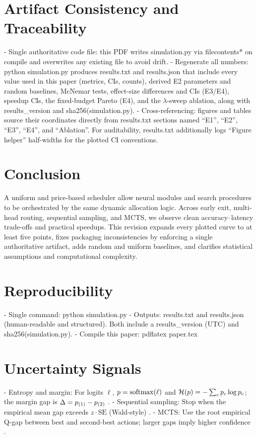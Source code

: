 \section{Artifact Consistency and Traceability}
- Single authoritative code file: this PDF writes simulation.py via filecontents* on compile and overwrites any existing file to avoid drift.
- Regenerate all numbers: python simulation.py produces results.txt and results.json that include every value used in this paper (metrics, CIs, counts), derived E2 parameters and random baselines, McNemar tests, effect-size differences and CIs (E3/E4), speedup CIs, the fixed-budget Pareto (E4), and the $\lambda$-sweep ablation, along with results\_version and sha256(simulation.py).
- Cross-referencing: figures and tables source their coordinates directly from results.txt sections named ``E1'', ``E2'', ``E3'', ``E4'', and ``Ablation''. For auditability, results.txt additionally logs ``Figure helper'' half-widths for the plotted CI conventions.

\section{Conclusion}
A uniform \TickAPI{} and price-based scheduler allow neural modules and search procedures to be orchestrated by the same dynamic allocation logic. Across early exit, multi-head routing, sequential sampling, and MCTS, we observe clean accuracy--latency trade-offs and practical speedups. This revision expands every plotted curve to at least five points, fixes packaging inconsistencies by enforcing a single authoritative artifact, adds random and uniform baselines, and clarifies statistical assumptions and computational complexity.

\section*{Reproducibility}
- Single command: python simulation.py
- Outputs: results.txt and results.json (human-readable and structured). Both include a results\_version (UTC) and sha256(simulation.py).
- Compile this paper: pdflatex paper.tex

\appendix

\section{Uncertainty Signals}
\label{app:uncertainty}
- Entropy and margin: For logits $\ell$, $p=\mathrm{softmax}(\ell)$ and $\mathcal{H}(p)=-\sum_c p_c \log p_c$; the margin gap is $\Delta = p_{(1)}-p_{(2)}$ \cite{Guo2017Calibration,Kaya2019ShallowDeep}.
- Sequential sampling: Stop when the empirical mean gap exceeds $z \cdot \mathrm{SE}$ (Wald-style) \cite{Wald1945Sequential,Hoeffding1963}.
- MCTS: Use the root empirical Q-gap between best and second-best actions; larger gaps imply higher confidence \cite{Kocsis2006UCT,Coulom2006MCTS}.

